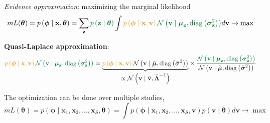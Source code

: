 \documentclass[a0paper,portrait,debug]{baposter}
\DeclareMathOperator{\diag}{diag}
\newcommand{\bs}{\boldsymbol}
\newcommand{\vx}{\mathbf{x}}
\newcommand{\vz}{\mathbf{z}}
\newcommand{\vv}{\mathbf{v}}
\newcommand{\prth}[1]{\left( #1 \right)}
\begin{document}
\begin{poster}
{  \emph{Evidence approximation}: maximizing the marginal likelihood\\[-0.5em]
  \begin{equation*}
    mL(\bs\theta) = p \prth{ \bs\phi \mid \vx, \bs\theta }
                  = \sum_{\vz} {\color{sub1} p\prth{ \vz \mid \bs\theta }}
                     \int {\color{sub2} p \prth{ \bs\phi \mid \vx, \vv }}\,
                          {\color{sub1} \mathcal{N}\prth{ \vv \mid \bs\mu_\vz, \diag\prth{\bs\sigma^2_\vz} }}
                          d\vv
                 \rightarrow \max
  \end{equation*}

  \vspace{0.75em}
  {\textbf{Quasi-Laplace approximation}:}
  \begin{equation*}
    {\color{sub2} p\prth{ \bs\phi \mid \vx, \vv }}\, {\color{sub1} \mathcal{N}\prth{ \vv \mid \bs\mu_\vz, \diag\prth{\bs\sigma^2_\vz} }} =
       {\color{black} \underbrace{ {\color{sub2} p\prth{ \bs\phi \mid \vx, \vv }}\, {\color{black} \mathcal{N}\prth{\vv \mid \tilde{\bs\mu}, \diag\prth{\tilde{\bs\sigma}^{2}} }} }_{
                       \displaystyle \propto \mathcal{N} \prth{ \mathbf{v} \mid \tilde{\vv}, \tilde{\bs\Lambda}^{-1} }}
       }
      \times \frac{{\color{sub1}\mathcal{N}\prth{ \vv \mid \bs\mu_\vz, \diag\prth{\bs\sigma^2_\vz} }}}{\color{black} \mathcal{N}\prth{\vv \mid \tilde{\bs\mu}, \diag\prth{\tilde{\bs\sigma}^{2}} }}
  \end{equation*}

  \vspace{1em}
  The optimization can be done over multiple studies,
  \begin{equation*}
    mL(\bs\theta) = p \left( \bs\phi \mid \vx_1, \vx_2, \ldots , \vx_S, \bs\theta \right)
                  = \int p \left( \bs\phi \mid \vx_1, \vx_2, \ldots , \vx_S, \vv \right) p \left( \vv \mid \bs\theta \right) d\vv \rightarrow \max
  \end{equation*}

}
\end{poster}
\end{document}
